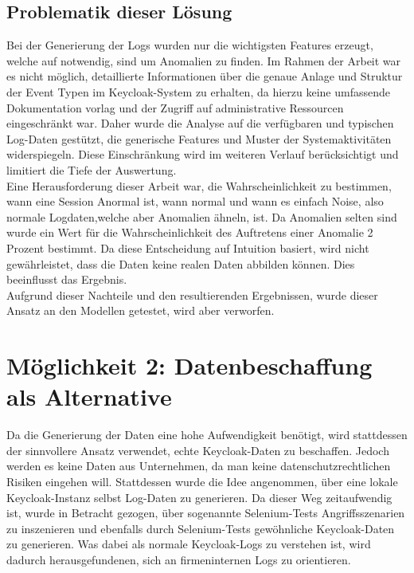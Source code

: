\documentclass[a4paper,12pt]{article}
\begin{document}
	\subsection{Problematik dieser Lösung}
	Bei der Generierung der Logs wurden nur die wichtigsten Features erzeugt, welche auf notwendig, sind um Anomalien zu finden. Im Rahmen der Arbeit war es nicht möglich, detaillierte Informationen über die genaue Anlage und Struktur der Event Typen im Keycloak-System zu erhalten, da hierzu keine umfassende Dokumentation vorlag und der Zugriff auf administrative Ressourcen eingeschränkt war. Daher wurde die Analyse auf die verfügbaren und typischen Log-Daten gestützt, die generische Features und Muster der Systemaktivitäten widerspiegeln. Diese Einschränkung wird im weiteren Verlauf berücksichtigt und limitiert die Tiefe der Auswertung.
	\\[0.5em]
	Eine Herausforderung dieser Arbeit war, die Wahrscheinlichkeit zu bestimmen, wann eine Session Anormal ist, wann normal und wann es einfach Noise, also normale Logdaten,welche aber Anomalien ähneln, ist. Da Anomalien selten sind wurde ein Wert für die Wahrscheinlichkeit des Auftretens einer Anomalie 2 Prozent bestimmt. Da diese Entscheidung auf Intuition basiert, wird nicht gewährleistet, dass die Daten keine realen Daten abbilden können. Dies beeinflusst das Ergebnis.
	\\[0.5em]
	Aufgrund dieser Nachteile und den resultierenden Ergebnissen, wurde dieser Ansatz an den Modellen getestet, wird aber verworfen.
	
	\section{Möglichkeit 2: Datenbeschaffung als Alternative}
	Da die Generierung der Daten eine hohe Aufwendigkeit benötigt, wird stattdessen der sinnvollere Ansatz verwendet, echte Keycloak-Daten zu beschaffen. Jedoch werden es keine Daten aus Unternehmen, da man keine datenschutzrechtlichen Risiken eingehen will. Stattdessen wurde die Idee angenommen, über eine lokale Keycloak-Instanz selbst Log-Daten zu generieren. Da dieser Weg zeitaufwendig ist, wurde in Betracht gezogen, über sogenannte Selenium-Tests Angriffsszenarien zu inszenieren und ebenfalls durch Selenium-Tests gewöhnliche Keycloak-Daten zu generieren. Was dabei als normale Keycloak-Logs zu verstehen ist, wird dadurch  herausgefundenen, sich an firmeninternen Logs zu orientieren.
	
\end{document}
